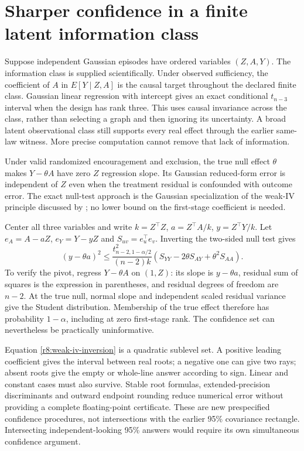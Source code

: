 \section{Sharper confidence in a finite latent information class}
\label{r8:graphs}

Suppose independent Gaussian episodes have ordered variables $(Z,A,Y)$.
The information class is supplied scientifically. Under observed sufficiency,
the coefficient of $A$ in $E[Y\mid Z,A]$ is the causal target throughout the
declared finite class. Gaussian linear regression with intercept gives an exact
conditional $t_{n-3}$ interval when the design has rank three. This uses causal
invariance across the class, rather than selecting a graph and then ignoring
its uncertainty. A broad latent observational class still supports every real
effect through the earlier same-law witness. More precise computation cannot
remove that lack of information.

Under valid randomized encouragement and exclusion, the true null effect
$\theta$ makes $Y-\theta A$ have zero $Z$ regression slope. Its Gaussian
reduced-form error is independent of $Z$ even when the treatment residual is
confounded with outcome error. The exact null-test approach is the Gaussian
specialization of the weak-IV principle discussed by \citet{staiger1994}; no
lower bound on the first-stage coefficient is needed.

Center all three variables and write
$k=Z^\top Z$, $a=Z^\top A/k$, $y=Z^\top Y/k$. Let $e_A=A-aZ$,
$e_Y=Y-yZ$ and $S_{uv}=e_u^\top e_v$. Inverting the two-sided null test gives
\begin{equation}
 (y-\theta a)^2\leq
 \frac{t_{n-2,1-\alpha/2}^2}{(n-2)k}
       (S_{YY}-2\theta S_{AY}+\theta^2S_{AA}).
 \label{r8:weak-iv-inversion}
\end{equation}
To verify the pivot, regress $Y-\theta A$ on $(1,Z)$: its slope is $y-\theta a$,
residual sum of squares is the expression in parentheses, and residual degrees
of freedom are $n-2$. At the true null, normal slope and independent scaled
residual variance give the Student distribution. Membership of the true effect
therefore has probability $1-\alpha$, including at zero first-stage rank.
The confidence set can nevertheless be practically uninformative.

Equation \eqref{r8:weak-iv-inversion} is a quadratic sublevel set. A positive
leading coefficient gives the interval between real roots; a negative one can
give two rays; absent roots give the empty or whole-line answer according to
sign. Linear and constant cases must also survive. Stable root formulas,
extended-precision discriminants and outward endpoint rounding reduce numerical
error without providing a complete floating-point certificate. These are new
prespecified confidence procedures, not intersections with the earlier 95\%
covariance rectangle. Intersecting independent-looking 95\% answers would
require its own simultaneous confidence argument.

